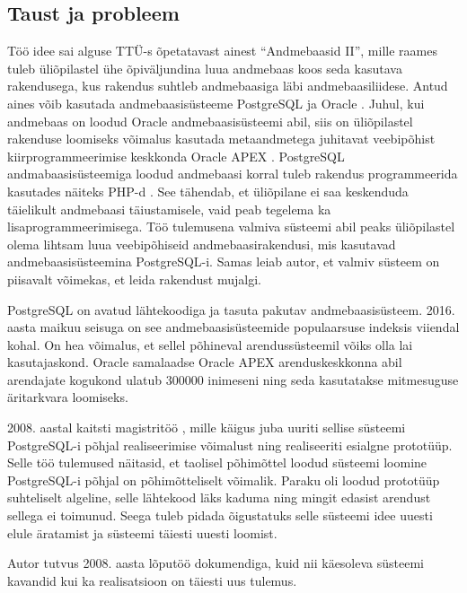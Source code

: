\documentclass[a4paper,12pt]{article} %
\begin{document}
\subsection{Taust ja probleem}
Töö idee sai alguse TTÜ-s õpetatavast ainest ``Andmebaasid II'', mille raames tuleb üliõpilastel ühe õpiväljundina luua andmebaas koos seda kasutava rakendusega, kus rakendus suhtleb andmebaasiga läbi andmebaasiliidese. Antud aines võib kasutada andmebaasisüsteeme PostgreSQL \cite{PostgreSQL} ja Oracle \cite{Oracle_DB}. Juhul, kui andmebaas on loodud Oracle andmebaasisüsteemi abil, siis on üliõpilastel rakenduse loomiseks võimalus kasutada metaandmetega juhitavat veebipõhist kiirprogrammeerimise keskkonda Oracle APEX \cite{Oracle_APEX}. PostgreSQL andmabaasisüsteemiga loodud andmebaasi korral tuleb rakendus programmeerida kasutades näiteks PHP-d \cite{PHP}.
See tähendab, et üliõpilane ei saa keskenduda täielikult andmebaasi täiustamisele, vaid peab tegelema ka lisaprogrammeerimisega. Töö tulemusena valmiva süsteemi abil peaks üliõpilastel olema lihtsam luua veebipõhiseid andmebaasirakendusi, mis kasutavad andmebaasisüsteemina PostgreSQL-i. Samas leiab autor, et valmiv süsteem on piisavalt võimekas, et leida rakendust mujalgi.\par

PostgreSQL on avatud lähtekoodiga ja tasuta pakutav andmebaasisüsteem. 2016. aasta maikuu seisuga on see andmebaasisüsteemide populaarsuse indeksis \cite{dbRanking} viiendal kohal. On hea võimalus, et sellel põhineval arendussüsteemil võiks olla lai kasutajaskond. Oracle samalaadse Oracle APEX arenduskeskkonna abil arendajate kogukond ulatub 300000 inimeseni \cite{oracleApexUsers} ning seda kasutatakse mitmesuguse äritarkvara loomiseks.\par

2008. aastal kaitsti magistritöö \cite{pgdb}, mille käigus juba uuriti sellise süsteemi PostgreSQL-i põhjal realiseerimise võimalust ning realiseeriti esialgne prototüüp. Selle töö tulemused näitasid, et taolisel põhimõttel loodud süsteemi loomine PostgreSQL-i põhjal on põhimõtteliselt võimalik. Paraku oli loodud prototüüp suhteliselt algeline, selle lähtekood läks kaduma ning mingit edasist arendust sellega ei toimunud. Seega tuleb pidada õigustatuks selle süsteemi idee uuesti elule äratamist ja süsteemi täiesti uuesti loomist.\par

Autor tutvus 2008. aasta lõputöö dokumendiga, kuid nii käesoleva süsteemi kavandid kui ka realisatsioon on täiesti uus tulemus.\par
\end{document}
